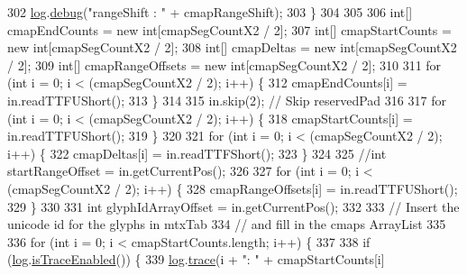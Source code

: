 \begin{DoxyCode}
302                 \mbox{\hyperlink{classorg_1_1newdawn_1_1slick_1_1tools_1_1hiero_1_1truetype_1_1_t_t_f_file_ae6acbd4aea68fd8cf15305aa535993f4}{log}}.\mbox{\hyperlink{classorg_1_1newdawn_1_1slick_1_1tools_1_1hiero_1_1truetype_1_1_log_a067b2d2d3d00472e36456a266302dc5b}{debug}}(\textcolor{stringliteral}{"rangeShift   : "} + cmapRangeShift);
303             \}
304 
305 
306             \textcolor{keywordtype}{int}[] cmapEndCounts = \textcolor{keyword}{new} \textcolor{keywordtype}{int}[cmapSegCountX2 / 2];
307             \textcolor{keywordtype}{int}[] cmapStartCounts = \textcolor{keyword}{new} \textcolor{keywordtype}{int}[cmapSegCountX2 / 2];
308             \textcolor{keywordtype}{int}[] cmapDeltas = \textcolor{keyword}{new} \textcolor{keywordtype}{int}[cmapSegCountX2 / 2];
309             \textcolor{keywordtype}{int}[] cmapRangeOffsets = \textcolor{keyword}{new} \textcolor{keywordtype}{int}[cmapSegCountX2 / 2];
310 
311             \textcolor{keywordflow}{for} (\textcolor{keywordtype}{int} i = 0; i < (cmapSegCountX2 / 2); i++) \{
312                 cmapEndCounts[i] = in.readTTFUShort();
313             \}
314 
315             in.skip(2);    \textcolor{comment}{// Skip reservedPad}
316 
317             \textcolor{keywordflow}{for} (\textcolor{keywordtype}{int} i = 0; i < (cmapSegCountX2 / 2); i++) \{
318                 cmapStartCounts[i] = in.readTTFUShort();
319             \}
320 
321             \textcolor{keywordflow}{for} (\textcolor{keywordtype}{int} i = 0; i < (cmapSegCountX2 / 2); i++) \{
322                 cmapDeltas[i] = in.readTTFShort();
323             \}
324 
325             \textcolor{comment}{//int startRangeOffset = in.getCurrentPos();}
326 
327             \textcolor{keywordflow}{for} (\textcolor{keywordtype}{int} i = 0; i < (cmapSegCountX2 / 2); i++) \{
328                 cmapRangeOffsets[i] = in.readTTFUShort();
329             \}
330 
331             \textcolor{keywordtype}{int} glyphIdArrayOffset = in.getCurrentPos();
332 
333             \textcolor{comment}{// Insert the unicode id for the glyphs in mtxTab}
334             \textcolor{comment}{// and fill in the cmaps ArrayList}
335 
336             \textcolor{keywordflow}{for} (\textcolor{keywordtype}{int} i = 0; i < cmapStartCounts.length; i++) \{
337 
338                 \textcolor{keywordflow}{if} (\mbox{\hyperlink{classorg_1_1newdawn_1_1slick_1_1tools_1_1hiero_1_1truetype_1_1_t_t_f_file_ae6acbd4aea68fd8cf15305aa535993f4}{log}}.\mbox{\hyperlink{classorg_1_1newdawn_1_1slick_1_1tools_1_1hiero_1_1truetype_1_1_log_a73eb47f8fc87ad6130feb4ddbeb492f1}{isTraceEnabled}}()) \{
339                     \mbox{\hyperlink{classorg_1_1newdawn_1_1slick_1_1tools_1_1hiero_1_1truetype_1_1_t_t_f_file_ae6acbd4aea68fd8cf15305aa535993f4}{log}}.\mbox{\hyperlink{classorg_1_1newdawn_1_1slick_1_1tools_1_1hiero_1_1truetype_1_1_log_a0d3284d40d3c3b8a9673fb7dfe12386d}{trace}}(i + \textcolor{stringliteral}{": "} + cmapStartCounts[i]

\end{DoxyCode}
